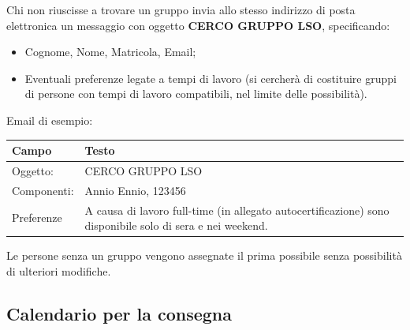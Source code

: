 \documentclass[
]{article}
\providecommand{\tightlist}{%
  \setlength{\itemsep}{0pt}\setlength{\parskip}{0pt}}
\begin{document}
Chi non riuscisse a trovare un gruppo invia allo stesso indirizzo di
posta elettronica un messaggio con oggetto \textbf{CERCO GRUPPO LSO},
specificando:

\begin{itemize}
\tightlist
\item
  Cognome, Nome, Matricola, Email;
\item
  Eventuali preferenze legate a tempi di lavoro (si cercherà di
  costituire gruppi di persone con tempi di lavoro compatibili, nel
  limite delle possibilità).
\end{itemize}

Email di esempio:

\begin{longtable}[]{@{}ll@{}}
\toprule
\begin{minipage}[b]{0.47\columnwidth}\raggedright
Campo\strut
\end{minipage} & \begin{minipage}[b]{0.47\columnwidth}\raggedright
Testo\strut
\end{minipage}\tabularnewline
\midrule
\endhead
\begin{minipage}[t]{0.47\columnwidth}\raggedright
Oggetto:\strut
\end{minipage} & \begin{minipage}[t]{0.47\columnwidth}\raggedright
CERCO GRUPPO LSO\strut
\end{minipage}\tabularnewline
\begin{minipage}[t]{0.47\columnwidth}\raggedright
Componenti:\strut
\end{minipage} & \begin{minipage}[t]{0.47\columnwidth}\raggedright
Annio Ennio, 123456\strut
\end{minipage}\tabularnewline
\begin{minipage}[t]{0.47\columnwidth}\raggedright
Preferenze\strut
\end{minipage} & \begin{minipage}[t]{0.47\columnwidth}\raggedright
A causa di lavoro full-time (in allegato autocertificazione) sono
disponibile solo di sera e nei weekend.\strut
\end{minipage}\tabularnewline
\bottomrule
\end{longtable}

Le persone senza un gruppo vengono assegnate il prima possibile senza
possibilità di ulteriori modifiche.

\hypertarget{calendario-per-la-consegna}{%
\subsection{Calendario per la
consegna}\label{calendario-per-la-consegna}}
\end{document}
